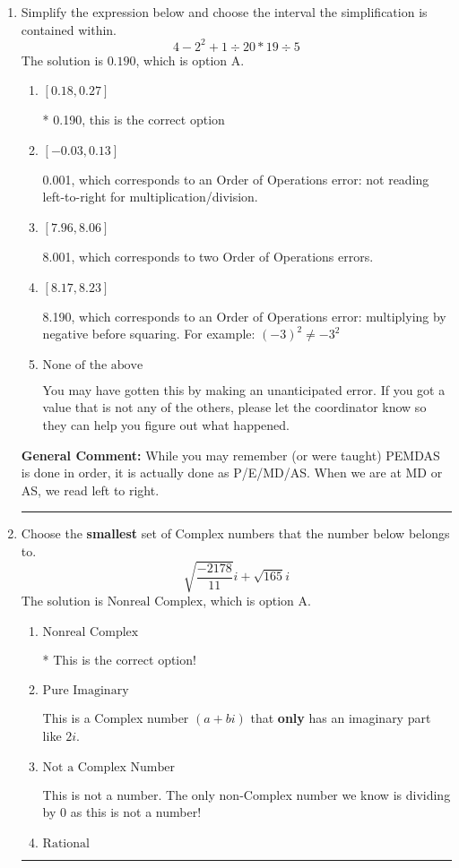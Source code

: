 \documentclass{extbook}[14pt]
\newcommand{\litem}[1]{\item #1

\rule{\textwidth}{0.4pt}}
\begin{document}
\begin{enumerate}\litem{
Simplify the expression below and choose the interval the simplification is contained within.
\[ 4 - 2^2 + 1 \div 20 * 19 \div 5 \]The solution is \( 0.190 \), which is option A.\begin{enumerate}[label=\Alph*.]
\item \( [0.18, 0.27] \)

* 0.190, this is the correct option
\item \( [-0.03, 0.13] \)

 0.001, which corresponds to an Order of Operations error: not reading left-to-right for multiplication/division.
\item \( [7.96, 8.06] \)

 8.001, which corresponds to two Order of Operations errors.
\item \( [8.17, 8.23] \)

 8.190, which corresponds to an Order of Operations error: multiplying by negative before squaring. For example: $(-3)^2 \neq -3^2$
\item \( \text{None of the above} \)

 You may have gotten this by making an unanticipated error. If you got a value that is not any of the others, please let the coordinator know so they can help you figure out what happened.
\end{enumerate}

\textbf{General Comment:} While you may remember (or were taught) PEMDAS is done in order, it is actually done as P/E/MD/AS. When we are at MD or AS, we read left to right.
}
\litem{
Choose the \textbf{smallest} set of Complex numbers that the number below belongs to.
\[ \sqrt{\frac{-2178}{11}} i+\sqrt{165}i \]The solution is \( \text{Nonreal Complex} \), which is option A.\begin{enumerate}[label=\Alph*.]
\item \( \text{Nonreal Complex} \)

* This is the correct option!
\item \( \text{Pure Imaginary} \)

This is a Complex number $(a+bi)$ that \textbf{only} has an imaginary part like $2i$.
\item \( \text{Not a Complex Number} \)

This is not a number. The only non-Complex number we know is dividing by 0 as this is not a number!
\item \( \text{Rational} \)


\end{enumerate}}
\end{enumerate}
\end{document}
